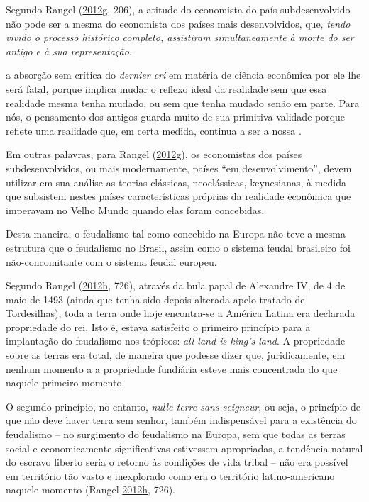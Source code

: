 \documentclass[
	12pt,				%
	oneside,			%
	a4paper,			%
	chapter=TITLE,		%
	section=TITLE,		%
	english,			%
	brazil				%
	]{abntex2}
\begin{document}
Segundo Rangel (\protect\hyperlink{ref-rangel1956}{2012}\protect\hyperlink{ref-rangel1956}{g}, 206), a atitude do economista do país
subdesenvolvido não pode ser a mesma do economista dos países mais
desenvolvidos, que, \emph{tendo vivido o processo histórico completo, assistiram
simultaneamente à morte do ser antigo e à sua representação}.
\begin{citacao} 
a absorção sem crítica do \emph{dernier cri} em matéria de ciência econômica por
ele lhe será fatal, porque implica mudar o reflexo ideal da realidade sem que
essa realidade mesma tenha mudado, ou sem que tenha mudado senão em parte. Para
nós, o pensamento dos antigos guarda muito de sua primitiva validade porque
reflete uma realidade que, em certa medida, continua a ser a nossa
\cite[p.~206-207]{rangel1956}.
\end{citacao}
Em outras palavras, para Rangel (\protect\hyperlink{ref-rangel1956}{2012}\protect\hyperlink{ref-rangel1956}{g}), os economistas dos países
subdesenvolvidos, ou mais modernamente, países ``em desenvolvimento'', devem
utilizar em sua análise as teorias clássicas, neoclássicas, keynesianas, à
medida que subsistem nestes países características próprias da realidade
econômica que imperavam no Velho Mundo quando elas foram concebidas.

Desta maneira, o feudalismo tal como concebido na Europa não teve a mesma
estrutura que o feudalismo no Brasil, assim como o sistema feudal brasileiro foi
não-concomitante com o sistema feudal europeu.

Segundo Rangel (\protect\hyperlink{ref-rangel1989}{2012}\protect\hyperlink{ref-rangel1989}{h}, 726), através da bula papal de Alexandre IV, de
4 de maio de 1493 (ainda que tenha sido depois alterada apelo tratado de
Tordesilhas), toda a terra onde hoje encontra-se a América Latina era declarada
propriedade do rei. Isto é, estava satisfeito o primeiro princípio para a
implantação do feudalismo nos trópicos: \emph{all land is king's land}. A propriedade
sobre as terras era total, de maneira que podesse dizer que, juridicamente, em
nenhum momento a a propriedade fundiária esteve mais concentrada do que naquele
primeiro momento.

O segundo princípio, no entanto, \emph{nulle terre sans seigneur}, ou seja, o
princípio de que não deve haver terra sem senhor, também indispensável para a
existência do feudalismo -- no surgimento do feudalismo na Europa, sem que todas
as terras social e economicamente significativas estivessem apropriadas, a
tendência natural do escravo liberto seria o retorno às condições de vida
tribal -- não era possível em território tão vasto e inexplorado como era o
território latino-americano naquele momento (Rangel \protect\hyperlink{ref-rangel1989}{2012}\protect\hyperlink{ref-rangel1989}{h}, 726).
\end{document}
